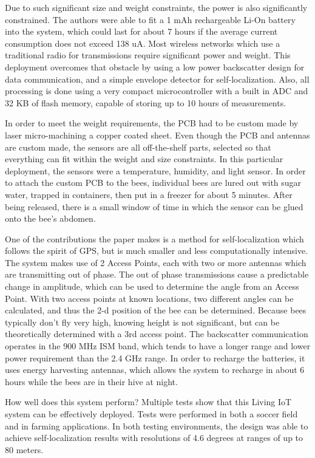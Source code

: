 \documentclass[letterpaper,twocolumn,10pt]{article}
\begin{document}
Due to such significant size and weight constraints, the power is also significantly constrained. The authors were able to fit a 1 mAh rechargeable Li-On battery into the system, which could last for about 7 hours if the average current consumption does not exceed 138 uA. Most wireless networks which use a traditional radio for transmissions require significant power and weight. This deployment overcomes that obstacle by using a low power backscatter design for data communication, and a simple envelope detector for self-localization. Also, all processing is done using a very compact microcontroller with a built in ADC and 32 KB of flash memory, capable of storing up to 10 hours of measurements. 

In order to meet the weight requirements, the PCB had to be custom made by laser micro-machining a copper coated sheet. Even though the PCB and antennas are custom made, the sensors are all off-the-shelf parts, selected so that everything can fit within the weight and size constraints. In this particular deployment, the sensors were a temperature, humidity, and light sensor. In order to attach the custom PCB to the bees, individual bees are lured out with sugar water, trapped in containers, then put in a freezer for about 5 minutes. After being released, there is a small window of time in which the sensor can be glued onto the bee's abdomen.

One of the contributions the paper makes is a method for self-localization which follows the spirit of GPS, but is much smaller and less computationally intensive. The system makes use of 2 Access Points, each with two or more antennas which are transmitting out of phase. The out of phase transmissions cause a predictable change in amplitude, which can be used to determine the angle from an Access Point. With two access points at known locations, two different angles can be calculated, and thus the 2-d position of the bee can be determined. Because bees typically don't fly very high, knowing height is not significant, but can be theoretically determined with a 3rd access point. The backscatter communication operates in the 900 MHz ISM band, which tends to have a longer range and lower power requirement than the 2.4 GHz range. In order to recharge the batteries, it uses energy harvesting antennas, which allows the system to recharge in about 6 hours while the bees are in their hive at night.

How well does this system perform? Multiple tests show that this Living IoT system can be effectively deployed. Tests were performed in both a soccer field and in farming applications. In both testing environments, the design was able to achieve self-localization results with resolutions of 4.6 degrees at ranges of up to 80 meters. 
\end{document}
